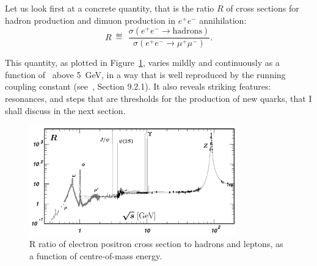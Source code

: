 Let us look first at a concrete quantity, that is the ratio $R$ of
cross sections for hadron production and dimuon production in
$e^{+}e^{-}$ annihilation:
\begin{equation}
R\: \eqdef \:\, \frac{\sigma(e^{+}e^{-}\to\textrm{hadrons})}{\sigma(e^{+}e^{-}\to\mu^{+}\mu^{-})}.
\end{equation}

This quantity, as plotted in Figure~\ref{fig:repem}, varies mildly and
continuously as a function of \s\ above 5~GeV, in a way that is well
reproduced by the running coupling constant (see~\cite{Agashe:2014kda}, Section
9.2.1). It also reveals striking features: resonances, and steps that are thresholds
for the production of new quarks, that I shall discuss in the next section. 

\begin{figure}[h]
\begin{center}
  \includegraphics[width=0.8\textwidth]{Chapters/pQCD/repem.png}
 \caption{R ratio of electron positron cross section to hadrons and
   leptons, as a function of centre-of-mass energy.}
 \label{fig:repem}
\end{center}
\end{figure}


